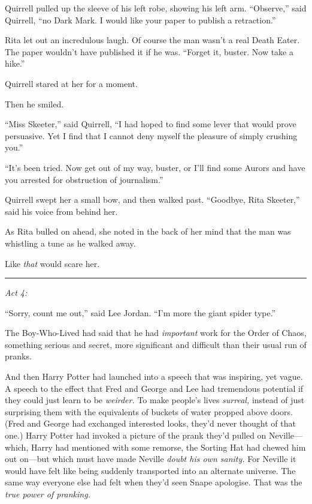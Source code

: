 Quirrell pulled up the sleeve of his left robe, showing his left arm.
``Observe,'' said Quirrell, ``no Dark Mark. I would like your paper to
publish a retraction.''

Rita let out an incredulous laugh. Of course the man wasn't a real Death
Eater. The paper wouldn't have published it if he was. ``Forget it,
buster. Now take a hike.''

Quirrell stared at her for a moment.

Then he smiled.

``Miss Skeeter,'' said Quirrell, ``I had hoped to find some lever that
would prove persuasive. Yet I find that I cannot deny myself the
pleasure of simply crushing you.''

``It's been tried. Now get out of my way, buster, or I'll find some
Aurors and have you arrested for obstruction of journalism.''

Quirrell swept her a small bow, and then walked past. ``Goodbye, Rita
Skeeter,'' said his voice from behind her.

As Rita bulled on ahead, she noted in the back of her mind that the man
was whistling a tune as he walked away.

Like \emph{that} would scare her.

\begin{center}\rule{3in}{0.4pt}\end{center}

\emph{Act 4:}

``Sorry, count me out,'' said Lee Jordan. ``I'm more the giant spider
type.''

The Boy-Who-Lived had said that he had \emph{important} work for the
Order of Chaos, something serious and secret, more significant and
difficult than their usual run of pranks.

And then Harry Potter had launched into a speech that was inspiring, yet
vague. A speech to the effect that Fred and George and Lee had
tremendous potential if they could just learn to be \emph{weirder.} To
make people's lives \emph{surreal,} instead of just surprising them with
the equivalents of buckets of water propped above doors. (Fred and
George had exchanged interested looks, they'd never thought of that
one.) Harry Potter had invoked a picture of the prank they'd pulled on
Neville---which, Harry had mentioned with some remorse, the Sorting Hat
had chewed him out on---but which must have made Neville \emph{doubt his
own sanity.} For Neville it would have felt like being suddenly
transported into an alternate universe. The same way everyone else had
felt when they'd seen Snape apologise. That was the \emph{true power of
pranking.}

